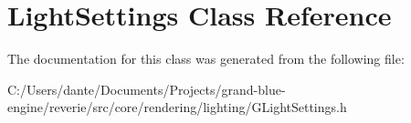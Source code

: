 \hypertarget{class_light_settings}{}\section{Light\+Settings Class Reference}
\label{class_light_settings}


The documentation for this class was generated from the following file\+:\begin{DoxyCompactItemize}
\item 
C\+:/\+Users/dante/\+Documents/\+Projects/grand-\/blue-\/engine/reverie/src/core/rendering/lighting/G\+Light\+Settings.\+h\end{DoxyCompactItemize}
